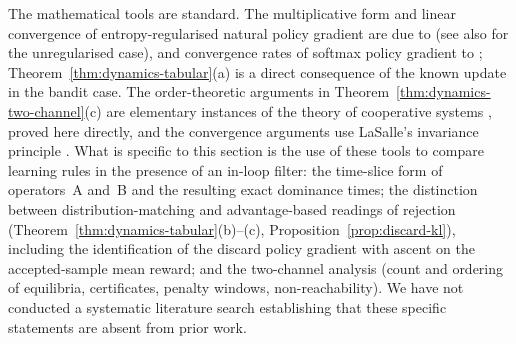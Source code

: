 \begin{remark}
\label{rem:known-vs-new}
The mathematical tools are standard. The multiplicative form and linear
convergence of entropy-regularised natural policy gradient are due to
\cite{cen2022fast} (see also \cite{agarwal2021theory} for the
unregularised case), and convergence rates of softmax policy gradient to
\cite{mei2020global}; Theorem~\ref{thm:dynamics-tabular}(a) is a direct
consequence of the known update in the bandit case. The order-theoretic
arguments in Theorem~\ref{thm:dynamics-two-channel}(c) are elementary
instances of the theory of cooperative systems
\cite{smith1995monotone,hirsch2006monotone}, proved here directly, and the
convergence arguments use LaSalle's invariance principle
\cite{lasalle1976stability}. What is specific to this section is the
use of these tools to compare learning rules in the presence of an
in-loop filter: the time-slice form of operators~A and~B and the resulting
exact dominance times; the distinction between distribution-matching and
advantage-based readings of rejection
(Theorem~\ref{thm:dynamics-tabular}(b)--(c),
Proposition~\ref{prop:discard-kl}), including the identification of the
discard policy gradient with ascent on the accepted-sample mean reward;
and the two-channel analysis (count and ordering of equilibria,
certificates, penalty windows, non-reachability). We have not conducted a
systematic literature search establishing that these specific statements
are absent from prior work.
\end{remark}
